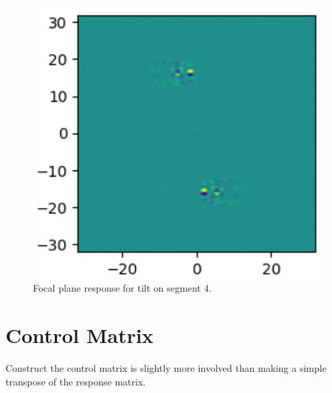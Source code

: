 \begin{figure}[H]
    \centering
    \includegraphics[width = 12cm]{Figures/I_diff.png}
    \caption{Focal plane response for tilt on segment 4.}
    \label{fig:I_diff}
\end{figure}



\section{Control Matrix}

Construct the control matrix is slightly more involved than making a simple transpose of the response matrix.
